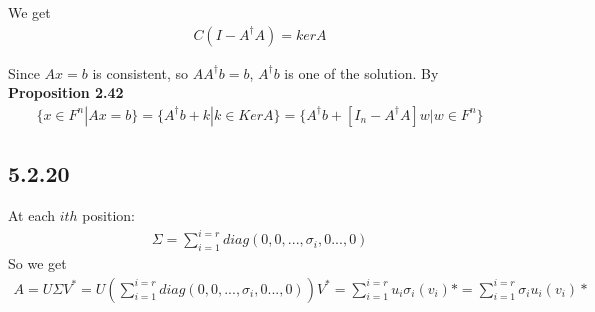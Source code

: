 \documentclass{article}
\begin{document}
We get 
\begin{equation*}
    \begin{split}
        C(I - A^\dagger A) = kerA 
    \end{split}
\end{equation*}

Since $Ax = b$ is consistent, so $AA^\dagger b = b$, $A ^\dagger b$ is one of the solution. By \textbf{Proposition 2.42}
\begin{equation*}
    \begin{split}
        \{ x \in F^n | Ax = b\} = \{ A^\dagger b + k | k \in KerA \} = \{ A^\dagger b + [I_n - A^\dagger A]w | w \in F^n \}
    \end{split}
\end{equation*}

\subsection*{5.2.20}
At each $ith$ position:
\begin{equation*}
    \begin{split}
        \Sigma = \sum_{i = 1}^{i = r} diag(0, 0, ..., \sigma_i, 0..., 0)
    \end{split}
\end{equation*}
So we get 
\begin{equation*}
    \begin{split}
        A = U \Sigma V^* = U (\sum_{i = 1}^{i = r} diag(0, 0, ..., \sigma_i, 0..., 0))  V^* = \sum_{i = 1}^{i = r} u_i \sigma_i (v_i)* = \sum_{i = 1}^{i = r} \sigma_i u_i  (v_i)*
    \end{split}
\end{equation*}
\end{document}
